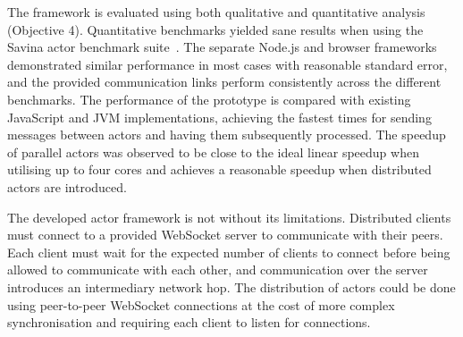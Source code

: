 \documentclass[lettersize,journal]{IEEEtran}
\begin{document}
The framework is evaluated using both qualitative and quantitative analysis (Objective 4). Quantitative benchmarks yielded sane results when using the Savina actor benchmark suite~\cite{savina}. The separate Node.js and browser frameworks demonstrated similar performance in most cases with reasonable standard error, and the provided communication links perform consistently across the different benchmarks. The performance of the prototype is compared with existing JavaScript and JVM implementations, achieving the fastest times for sending messages between actors and having them subsequently processed. The speedup of parallel actors was observed to be close to the ideal linear speedup when utilising up to four cores and achieves a reasonable speedup when distributed actors are introduced. 

The developed actor framework is not without its limitations. Distributed clients must connect to a provided WebSocket server to communicate with their peers. Each client must wait for the expected number of clients to connect before being allowed to communicate with each other, and communication over the server introduces an intermediary network hop. The distribution of actors could be done using peer-to-peer WebSocket connections at the cost of more complex synchronisation and requiring each client to listen for connections.
\newpage


\end{document}
